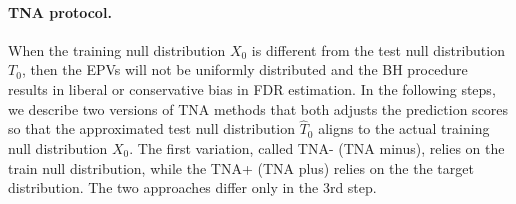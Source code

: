 \documentclass{article}
\begin{document}
\paragraph{TNA protocol.} When the training null distribution $X_0$ is different from the test null distribution $T_0$, then the EPVs will not be uniformly distributed and the BH procedure results in liberal or conservative bias in FDR estimation. In the following steps, we describe two versions of TNA methods that both adjusts the prediction scores so that the approximated test null distribution $\hat{T}_0$ aligns to the actual training null distribution $X_0$. The first variation, called TNA- (TNA minus), relies on the train null distribution, while the TNA+ (TNA plus) relies on the the target distribution. The two approaches differ only in the 3rd step. 
\end{document}
